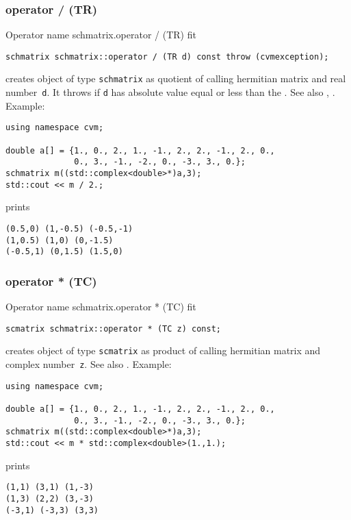 \subsubsection{operator / (TR)}
Operator%
\pdfdest name {schmatrix.operator / (TR)} fit
\begin{verbatim}
schmatrix schmatrix::operator / (TR d) const throw (cvmexception);
\end{verbatim}
creates  object of type \verb"schmatrix" as  quotient of
 calling hermitian matrix and  real number~\verb"d". It throws
if \verb"d" has  absolute value equal or less than the
.
See also ,
.
Example:
\begin{Verbatim}
using namespace cvm;

double a[] = {1., 0., 2., 1., -1., 2., 2., -1., 2., 0.,
              0., 3., -1., -2., 0., -3., 3., 0.};
schmatrix m((std::complex<double>*)a,3);
std::cout << m / 2.;
\end{Verbatim}
prints
\begin{Verbatim}
(0.5,0) (1,-0.5) (-0.5,-1)
(1,0.5) (1,0) (0,-1.5)
(-0.5,1) (0,1.5) (1.5,0)
\end{Verbatim}
\newpage



\subsubsection{operator * (TC)}
Operator%
\pdfdest name {schmatrix.operator * (TC)} fit
\begin{verbatim}
scmatrix schmatrix::operator * (TC z) const;
\end{verbatim}
creates  object of type \verb"scmatrix" as  product of
 calling hermitian matrix and  complex number~\verb"z".
See also .
Example:
\begin{Verbatim}
using namespace cvm;

double a[] = {1., 0., 2., 1., -1., 2., 2., -1., 2., 0.,
              0., 3., -1., -2., 0., -3., 3., 0.};
schmatrix m((std::complex<double>*)a,3);
std::cout << m * std::complex<double>(1.,1.);
\end{Verbatim}
prints
\begin{Verbatim}
(1,1) (3,1) (1,-3)
(1,3) (2,2) (3,-3)
(-3,1) (-3,3) (3,3)
\end{Verbatim}
\newpage



